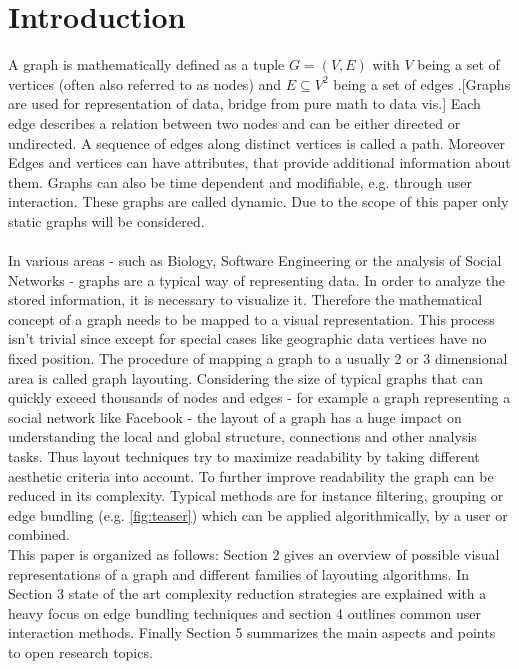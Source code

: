\section{Introduction}
A graph is mathematically defined as a tuple $ G = (V, E)$ with $V$ being a set of vertices (often also referred to as nodes) and $E \subseteq V^2$ being a set of edges \cite{Al-Taie2017}.[Graphs are used for representation of data, bridge from pure math to data vis.] Each edge describes a relation between two nodes and can be either directed or undirected. A sequence of edges along distinct vertices is called a path. Moreover Edges and vertices can have attributes, that provide additional information about them. Graphs can also be time dependent and modifiable, e.g. through user interaction. These graphs are called dynamic. Due to the scope of this paper only static graphs will be considered. 
\\\\
In various areas - such as Biology, Software Engineering or the analysis of Social Networks - graphs are a typical way of representing data. In order to analyze the stored information, it is necessary to visualize it. Therefore the mathematical concept of a graph needs to be mapped to a visual representation. This process isn't trivial since except for special cases like geographic data vertices have no fixed position.
The procedure of mapping a graph to a usually 2 or 3 dimensional area is called graph layouting. 
Considering the size of typical graphs that can quickly exceed thousands of nodes and edges - for example a graph representing a social network like Facebook -  the layout of a graph has a huge impact on understanding the local and global structure, connections and other analysis tasks. Thus layout techniques try to maximize readability by taking different aesthetic criteria into account. To further improve readability the graph can be reduced in its complexity. Typical methods are for instance filtering, grouping or edge bundling (e.g. \autoref{fig:teaser}) which can be applied algorithmically, by a user or combined. \\ This paper is organized as follows: Section 2 gives an overview of possible visual representations of a graph and different families of layouting algorithms. In Section 3 state of the art complexity reduction strategies are explained with a heavy focus on edge bundling techniques and section 4 outlines common user interaction methods. Finally Section 5 summarizes the main aspects and points to open research topics.



